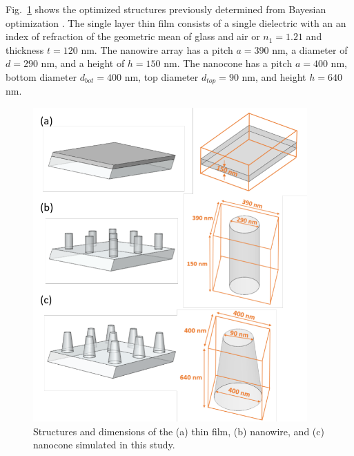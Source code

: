 \documentclass[preprint,12pt]{elsarticle}
\begin{document}
Fig.~\ref{fig:Structures} 
shows the optimized structures previously determined from Bayesian optimization
\cite{Haghanifar:20}.
The single layer thin film consists of a single dielectric 
with an an index of refraction of the geometric mean of glass and air or $n_1 = 1.21$ and thickness  $t = 120$ nm. 
The nanowire array has a pitch $a = 390$ nm, a diameter of $d = 290$ nm, and a height of $h = 150$ nm.
The nanocone has a pitch $a = 400$ nm, 
bottom diameter $d_{bot} = 400$ nm, top diameter $d_{top} = 90$ nm, and height $h = 640$ nm.
\begin{figure}[H]
\vspace{-10pt}
 \centering
 \includegraphics[width=10.5cm]{Schematic}
\caption{Structures and dimensions of the (a) thin film, (b) nanowire, and (c) nanocone simulated in this study.}
 \label{fig:Structures}
 \end{figure}
\end{document}
